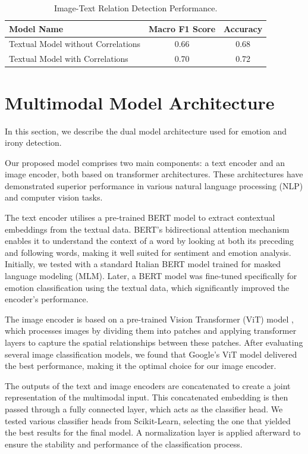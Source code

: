 \documentclass[letterpaper,journal]{IEEEtran}
\begin{document}
\begin{table}[htb!]
\begin{center}
{\footnotesize
\begin{tabular}{l|c|c}
\hline
\textbf{Model Name} & \textbf{Macro F1 Score} & \textbf{Accuracy} \\
\hline
Textual Model without Correlations & 0.66 & 0.68 \\
Textual Model with Correlations & 0.70 & 0.72 \\
\hline
\end{tabular}
}
\end{center}
\setlength{\belowcaptionskip}{-0.1cm}
\caption{Image-Text Relation Detection Performance.}
\label{table:relation}
\end{table}


\section{Multimodal Model Architecture}
In this section, we describe the dual model architecture used for emotion and irony detection.

Our proposed model comprises two main components: a text encoder and an image encoder, both based on transformer architectures. These architectures have demonstrated superior performance in various natural language processing (NLP) and computer vision tasks.

The text encoder utilises a pre-trained BERT model \cite{devlin2019bert} to extract contextual embeddings from the textual data. BERT's bidirectional attention mechanism enables it to understand the context of a word by looking at both its preceding and following words, making it well suited for sentiment and emotion analysis. Initially, we tested with a standard Italian BERT model trained for masked language modeling (MLM). Later, a BERT model was fine-tuned specifically for emotion classification using the textual data, which significantly improved the encoder's performance.

The image encoder is based on a pre-trained Vision Transformer (ViT) model \cite{dosovitskiy2021vit}, which processes images by dividing them into patches and applying transformer layers to capture the spatial relationships between these patches. After evaluating several image classification models, we found that Google's ViT model delivered the best performance, making it the optimal choice for our image encoder.

The outputs of the text and image encoders are concatenated to create a joint representation of the multimodal input. This concatenated embedding is then passed through a fully connected layer, which acts as the classifier head. We tested various classifier heads from Scikit-Learn, selecting the one that yielded the best results for the final model. A normalization layer is applied afterward to ensure the stability and performance of the classification process.
\end{document}
